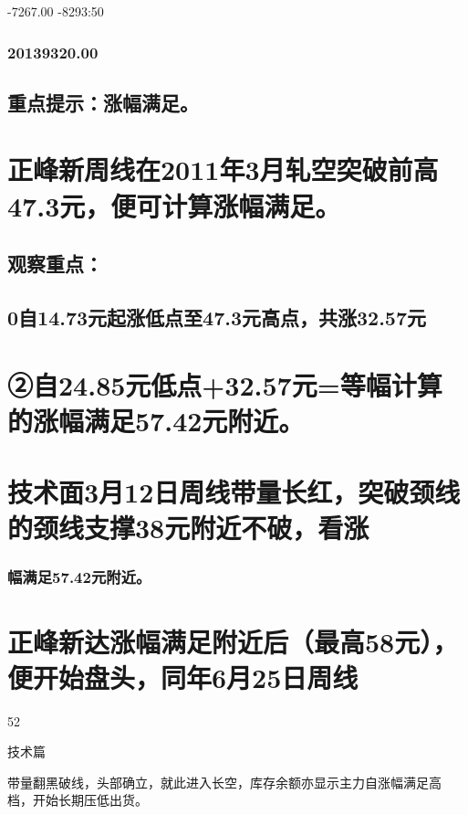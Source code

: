 \documentclass{article}
\begin{document}
-7267.00 -8293:50

\subsubsection{20139320.00}

\subsection{重点提示：涨幅满足。}

\section{正峰新周线在2011年3月轧空突破前高47.3元，便可计算涨幅满足。}

\subsection{观察重点：}

\subsection{0自14.73元起涨低点至47.3元高点，共涨32.57元}

\section{②自24.85元低点+32.57元=等幅计算的涨幅满足57.42元附近。}

\section{技术面3月12日周线带量长红，突破颈线的颈线支撑38元附近不破，看涨}

\subsubsection{幅满足57.42元附近。}

\section{正峰新达涨幅满足附近后（最高58元），便开始盘头，同年6月25日周线}

52

\clearpage

技术篇

带量翻黑破线，头部确立，就此进入长空，库存余额亦显示主力自涨幅满足高 档，开始长期压低出货。
\end{document}
